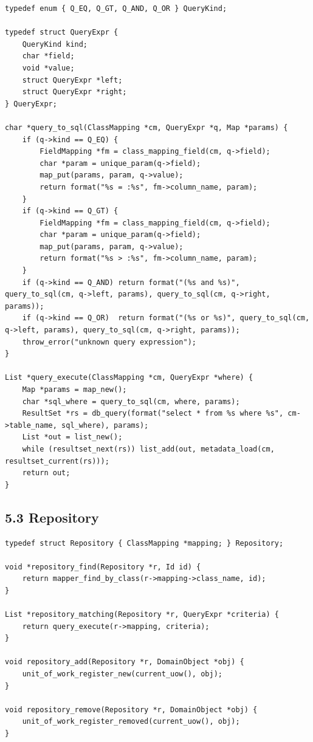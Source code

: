\documentclass[11pt]{article}
\begin{document}
\begin{verbatim}
typedef enum { Q_EQ, Q_GT, Q_AND, Q_OR } QueryKind;

typedef struct QueryExpr {
    QueryKind kind;
    char *field;
    void *value;
    struct QueryExpr *left;
    struct QueryExpr *right;
} QueryExpr;

char *query_to_sql(ClassMapping *cm, QueryExpr *q, Map *params) {
    if (q->kind == Q_EQ) {
        FieldMapping *fm = class_mapping_field(cm, q->field);
        char *param = unique_param(q->field);
        map_put(params, param, q->value);
        return format("%s = :%s", fm->column_name, param);
    }
    if (q->kind == Q_GT) {
        FieldMapping *fm = class_mapping_field(cm, q->field);
        char *param = unique_param(q->field);
        map_put(params, param, q->value);
        return format("%s > :%s", fm->column_name, param);
    }
    if (q->kind == Q_AND) return format("(%s and %s)", query_to_sql(cm, q->left, params), query_to_sql(cm, q->right, params));
    if (q->kind == Q_OR)  return format("(%s or %s)", query_to_sql(cm, q->left, params), query_to_sql(cm, q->right, params));
    throw_error("unknown query expression");
}

List *query_execute(ClassMapping *cm, QueryExpr *where) {
    Map *params = map_new();
    char *sql_where = query_to_sql(cm, where, params);
    ResultSet *rs = db_query(format("select * from %s where %s", cm->table_name, sql_where), params);
    List *out = list_new();
    while (resultset_next(rs)) list_add(out, metadata_load(cm, resultset_current(rs)));
    return out;
}
\end{verbatim}

\subsection{5.3 Repository}\label{repository}

\begin{verbatim}
typedef struct Repository { ClassMapping *mapping; } Repository;

void *repository_find(Repository *r, Id id) {
    return mapper_find_by_class(r->mapping->class_name, id);
}

List *repository_matching(Repository *r, QueryExpr *criteria) {
    return query_execute(r->mapping, criteria);
}

void repository_add(Repository *r, DomainObject *obj) {
    unit_of_work_register_new(current_uow(), obj);
}

void repository_remove(Repository *r, DomainObject *obj) {
    unit_of_work_register_removed(current_uow(), obj);
}
\end{verbatim}
\end{document}
